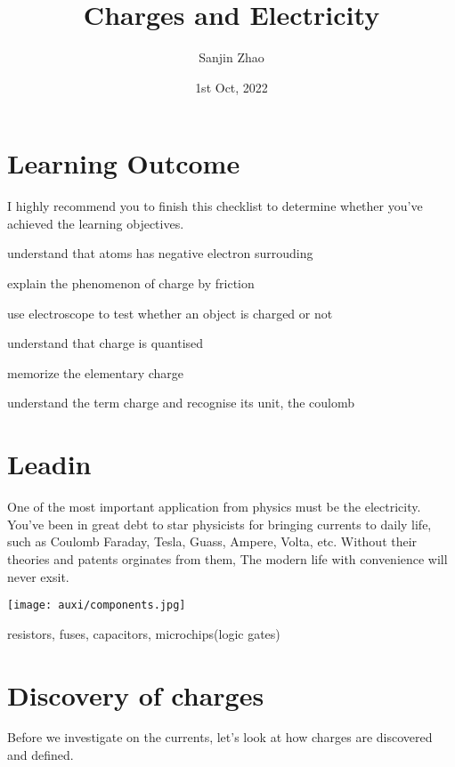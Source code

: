 \documentclass[a4paper]{tufte-handout}
\title{Charges and Electricity}
\author{Sanjin Zhao}
\date{1st Oct, 2022}  %
\begin{document}
\maketitle%
\section*{Learning Outcome}
I highly recommend you to finish this checklist to determine whether you've achieved the learning objectives.
\begin{todolist}
  \item understand that atoms has negative electron surrouding
  \item explain the phenomenon of charge by friction
  \item use electroscope to test whether an object is charged or not
  \item understand that charge is quantised
  \item memorize the elementary charge
  \item understand the term charge and recognise its unit, the coulomb


\end{todolist}
\clearpage

\section{Leadin}
One of the most important application from physics must be the electricity. You've been in great debt to star physicists for bringing currents to daily life, such as Coulomb Faraday, Tesla, Guass, Ampere, Volta, etc. Without their theories and patents orginates from them, The modern life with convenience will never exsit.
\begin{marginfigure}
\centering
\texttt{[image: auxi/components.jpg]}
\caption{resistors, fuses, capacitors, microchips(logic gates)}
\end{marginfigure}

\section{Discovery of charges}
Before we investigate on the currents, let's look at how charges are discovered and defined.
\end{document}
